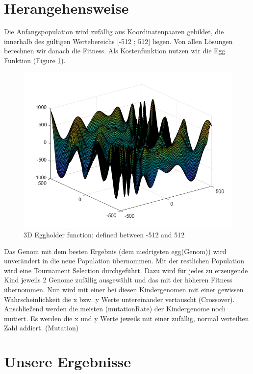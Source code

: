 \documentclass{hbrs-ecta-report}
\begin{document}
\FloatBarrier

\section{Herangehensweise}
Die Anfangspopulation wird zufällig aus Koordinatenpaaren gebildet, die innerhalb des gültigen Wertebereichs [-512 ; 512] liegen. Von allen Lösungen berechnen wir danach die Fitness. Als Kostenfunktion nutzen wir die Egg Funktion (Figure \ref{fig:egg}). 

\begin{figure}[h]
	\includegraphics[width=\linewidth]{img/egg}
	\caption{3D Eggholder function: defined between -512 and 512}
	\label{fig:egg}
\end{figure}

Das Genom mit dem besten Ergebnis (dem niedrigsten egg(Genom)) wird unverändert in die neue Population übernommen.
Mit der restlichen Population wird eine Tournament Selection durchgeführt. Dazu wird für jedes zu erzeugende Kind jeweils 2 Genome zufällig  ausgewählt und das mit der höheren Fitness übernommen. \newline
Nun wird mit einer bei diesen Kindergenomen mit einer gewissen Wahrscheinlichkeit die x bzw. y Werte untereinander vertauscht (Crossover).
\newline
Anschließend werden die meisten (mutationRate) der Kindergenome noch mutiert. Es werden die x und y Werte jeweils mit einer zufällig, normal verteilten Zahl addiert. (Mutation)

\FloatBarrier
\newpage

\section{Unsere Ergebnisse}
\end{document}
